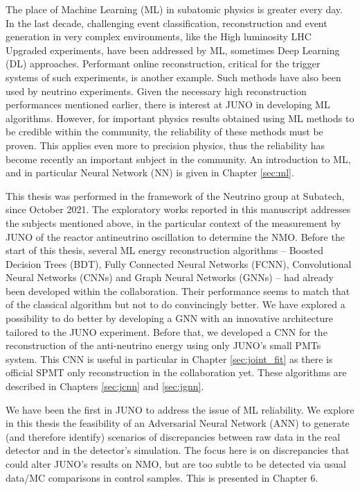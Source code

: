 The place of Machine Learning (ML) in subatomic physics is greater every day.
In the last decade, challenging event classification, reconstruction and event generation in very complex environments, like the High luminosity LHC Upgraded experiments, have been addressed by ML, sometimes Deep Learning (DL) approaches.
Performant online reconstruction, critical for the trigger systems of such experiments, is another example.
Such methods have also been used by neutrino experiments. Given the necessary high reconstruction performances mentioned earlier, there is interest at JUNO in developing ML algorithms.
However, for important physics results obtained using ML methods to be credible within the community, the reliability of these methods must be proven. This applies even more to precision physics, thus the reliability has become recently an important subject in the community.
An introduction to ML, and in particular Neural Network (NN) is given in Chapter \ref{sec:ml}.

\hfill

This thesis was performed in the framework of the Neutrino group at Subatech, since October 2021. The exploratory works reported in this manuscript addresses the subjects mentioned above, in the particular context of the measurement by JUNO of the reactor antineutrino
oscillation to determine the NMO.
Before the start of this thesis, several ML energy reconstruction algorithms -- Boosted Decision Trees (BDT), Fully Connected Neural Networks (FCNN), Convolutional Neural Networks (CNNs) and Graph Neural Networks (GNNs) --  had already been developed within
the collaboration. Their performance seems to match that of the classical algorithm but not to do convincingly better. We have explored a possibility
to do better by developing a GNN with an innovative architecture tailored to the JUNO experiment. Before that, we developed a CNN for the reconstruction of the anti-neutrino
energy using only JUNO's small PMTs system.
This CNN is useful in particular in Chapter \ref{sec:joint_fit} as there is official SPMT only reconstruction in the collaboration yet. These algorithms are described in Chapters \ref{sec:jcnn} and \ref{sec:jgnn}.

We have been the first in JUNO to address the issue of ML reliability.
We explore in this thesis the feasibility of an Adversarial Neural Network (ANN) to generate (and therefore identify) scenarios of discrepancies
between raw data in the real detector and in the detector's simulation.
The focus here is on discrepancies that could alter JUNO's results on NMO, but are too subtle to be detected via usual data/MC comparisons in control samples.
This is presented in Chapter 6.


